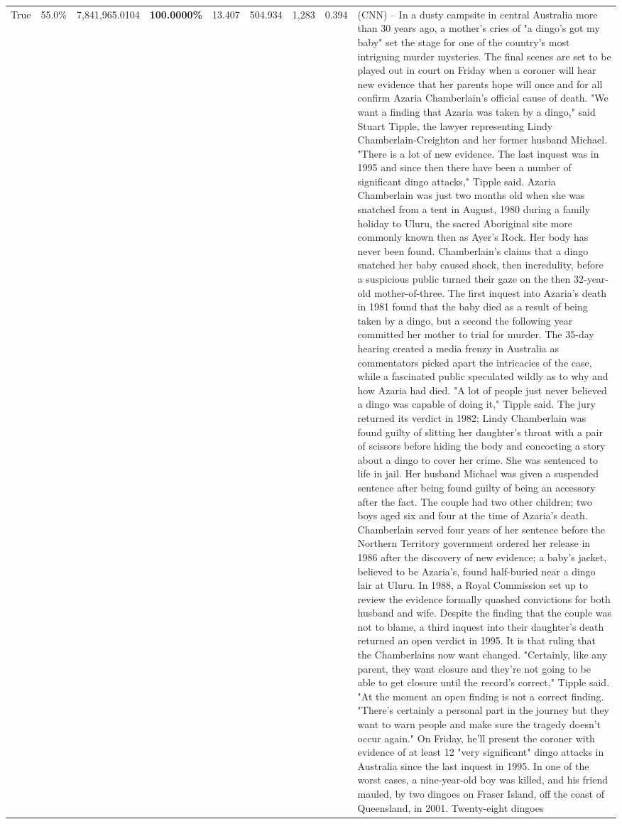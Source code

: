 \begin{table}[H]
\begin{tabular}{lllrlllll}
True & 55.0\% & 7,841,965.0104 & \bfseries \color{red} 100.0000\% & 13.407 & 504.934 & 1,283 & 0.394 & (CNN) -- In a dusty campsite in central Australia more than 30 years ago, a mother's cries of "a dingo's got my baby" set the stage for one of the country's most intriguing murder mysteries. The final scenes are set to be played out in court on Friday when a coroner will hear new evidence that her parents hope will once and for all confirm Azaria Chamberlain's official cause of death. "We want a finding that Azaria was taken by a dingo," said Stuart Tipple, the lawyer representing Lindy Chamberlain-Creighton and her former husband Michael. "There is a lot of new evidence. The last inquest was in 1995 and since then there have been a number of significant dingo attacks," Tipple said. Azaria Chamberlain was just two months old when she was snatched from a tent in August, 1980 during a family holiday to Uluru, the sacred Aboriginal site more commonly known then as Ayer's Rock. Her body has never been found. Chamberlain's claims that a dingo snatched her baby caused shock, then incredulity, before a suspicious public turned their gaze on the then 32-year-old mother-of-three. The first inquest into Azaria's death in 1981 found that the baby died as a result of being taken by a dingo, but a second the following year committed her mother to trial for murder. The 35-day hearing created a media frenzy in Australia as commentators picked apart the intricacies of the case, while a fascinated public speculated wildly as to why and how Azaria had died. "A lot of people just never believed a dingo was capable of doing it," Tipple said. The jury returned its verdict in 1982; Lindy Chamberlain was found guilty of slitting her daughter's throat with a pair of scissors before hiding the body and concocting a story about a dingo to cover her crime. She was sentenced to life in jail. Her husband Michael was given a suspended sentence after being found guilty of being an accessory after the fact. The couple had two other children; two boys aged six and four at the time of Azaria's death. Chamberlain served four years of her sentence before the Northern Territory government ordered her release in 1986 after the discovery of new evidence; a baby's jacket, believed to be Azaria's, found half-buried near a dingo lair at Uluru. In 1988, a Royal Commission set up to review the evidence formally quashed convictions for both husband and wife. Despite the finding that the couple was not to blame, a third inquest into their daughter's death returned an open verdict in 1995. It is that ruling that the Chamberlains now want changed. "Certainly, like any parent, they want closure and they're not going to be able to get closure until the record's correct," Tipple said. "At the moment an open finding is not a correct finding. "There's certainly a personal part in the journey but they want to warn people and make sure the tragedy doesn't occur again." On Friday, he'll present the coroner with evidence of at least 12 "very significant" dingo attacks in Australia since the last inquest in 1995. In one of the worst cases, a nine-year-old boy was killed, and his friend mauled, by two dingoes on Fraser Island, off the coast of Queensland, in 2001. Twenty-eight dingoes 
\end{tabular}
\end{table}
